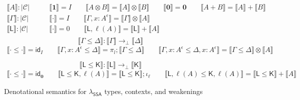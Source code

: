 \documentclass[acmsmall,screen,review]{acmart}
\newcommand{\mc}[1]{\ensuremath{\mathcal{#1}}}
\newcommand{\mb}[1]{\ensuremath{\mathbf{#1}}}
\newcommand{\ms}[1]{\ensuremath{\mathsf{#1}}}
\newcommand{\thyp}[3]{#1 : {#2}^{#3}}
\newcommand{\lhyp}[2]{#1(#2)}
\newcommand{\dnt}[1]{\llbracket{#1}\rrbracket}
\newcommand{\isotopessa}{\(\lambda_{\ms{SSA}}\)}
\begin{document}
\begin{figure}
  \begin{align*}
    \boxed{\dnt{A} : |\mc{C}|} \qquad 
    & \dnt{\mb{1}} = I \qquad
      \dnt{A \otimes B} = \dnt{A} \otimes \dnt{B} \qquad
      \dnt{\mb{0}} = \mb{0} \qquad
      \dnt{A + B} = \dnt{A} + \dnt{B} \qquad \\
    \boxed{\dnt{\Gamma} : |\mc{C}|} \qquad
    & \dnt{\cdot} = I \qquad
      \dnt{\Gamma, \thyp{x}{A}{\epsilon}} = \dnt{\Gamma} \otimes \dnt{A} \\
    \boxed{\dnt{\ms{L}} : |\mc{C}|} \qquad
    & \dnt{\cdot} = 0 \qquad
      \dnt{\ms{L}, \lhyp{\ell}{A}} = \dnt{\ms{L}} + \dnt{A} \\
  \end{align*}
  \begin{equation*}
    \boxed{\dnt{\Gamma \leq \Delta} : \dnt{\Gamma} \to_\bot \dnt{\Delta}}
  \end{equation*}
  \begin{gather*}
    \dnt{\cdot \leq \cdot} = \ms{id}_I \qquad
    \dnt{\Gamma, \thyp{x}{A}{\epsilon} \leq \Delta} = \pi_l;\dnt{\Gamma \leq \Delta} \qquad
    \dnt{\Gamma, \thyp{x}{A}{\epsilon} \leq \Delta, \thyp{x}{A}{\epsilon}}
    = \dnt{\Gamma \leq \Delta} \otimes \dnt{A} \\ \\
  \end{gather*}
  \begin{equation*}
    \boxed{\dnt{\ms{L} \leq \ms{K}} : \dnt{\ms{L}} \to_\bot \dnt{\ms{K}}}
  \end{equation*}
  \begin{gather*}
    \dnt{\cdot \leq \cdot} = \ms{id}_{\mb{0}} \qquad
    \dnt{\ms{L} \leq \ms{K}, \lhyp{\ell}{A}} = \dnt{\ms{L} \leq \ms{K}};\iota_\ell \qquad
    \dnt{\ms{L}, \lhyp{\ell}{A} \leq \ms{K}, \lhyp{\ell}{A}}
    = \dnt{\ms{L} \leq \ms{K}} + \dnt{A}
  \end{gather*}
  \caption{Denotational semantics for \isotopessa{} types, contexts, and weakenings}
  \Description{}
  \label{fig:ssa-ty-sem}
\end{figure}
\end{document}
